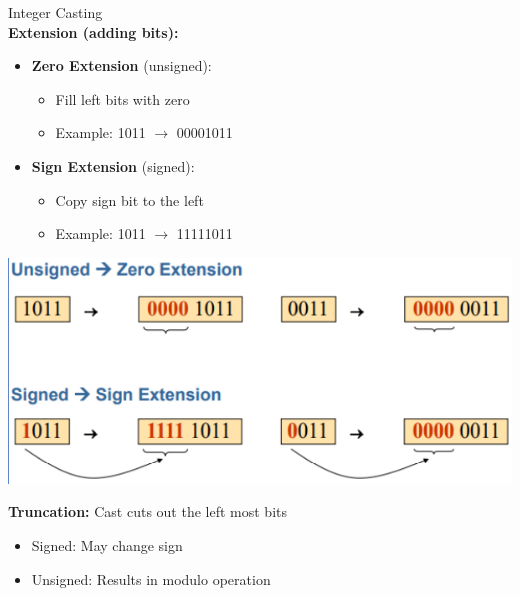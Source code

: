 \begin{definition}{Integer Casting}\\
\textbf{Extension (adding bits):}

\begin{minipage}{0.5\textwidth}
\begin{itemize}
  \item \textbf{Zero Extension} (unsigned):
    \begin{itemize}
      \item Fill left bits with zero
      \item Example: 1011 $\rightarrow$ 00001011
    \end{itemize}
\end{itemize}
\end{minipage}
\begin{minipage}{0.5\textwidth}
\begin{itemize}
  \item \textbf{Sign Extension} (signed):
    \begin{itemize}
      \item Copy sign bit to the left
      \item Example: 1011 $\rightarrow$ 11111011
    \end{itemize}
\end{itemize}
\end{minipage}

\includegraphics[width=0.7\linewidth]{images/sign_extension.png}

\textbf{Truncation:} Cast cuts out the left most bits
\begin{itemize}
  \item Signed: May change sign
  \item Unsigned: Results in modulo operation
\end{itemize}
\end{definition}

